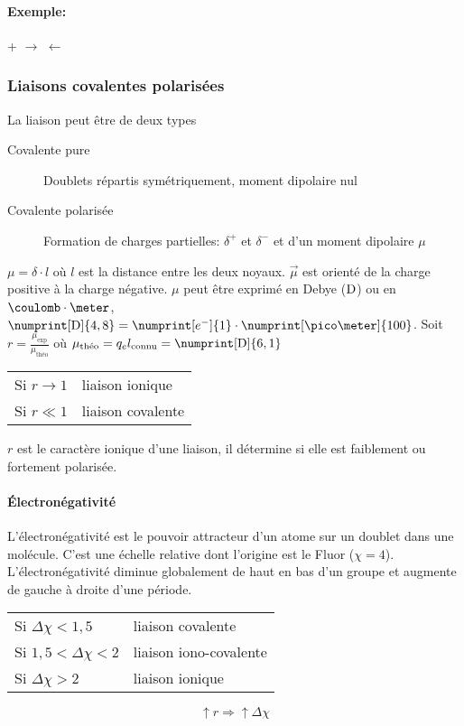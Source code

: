 \paragraph{Exemple:}
\begin{center}
  \hspace{0.3cm} + \hspace{0.3cm}$\longrightarrow$ $\leftarrow$
\end{center}
\subsubsection{Liaisons covalentes polarisées}
La liaison peut être de deux types
\begin{description}
  \item[Covalente pure] Doublets répartis symétriquement,
    moment dipolaire nul
  \item[Covalente polarisée] Formation de charges partielles:
    $\delta^+$ et $\delta^-$ et d'un moment dipolaire $\mu$
\end{description}
$\mu = \delta \cdot l$ où $l$ est la distance entre les deux noyaux.
$\vec{\mu}$ est orienté de la charge positive à la charge négative.
$\mu$ peut être exprimé en Debye ($\mathrm{D}$) ou en $\coulomb\cdot\meter$,
$\numprint[\debye]{4,8} = \numprint[e^-]{1} \cdot \numprint[\pico\meter]{100}$.
Soit $r = \frac{\mu_{\mathrm{exp}}}{\mu_{\textrm{théo}}}$
où $\mu_{\textrm{théo}} = q_e l_{\mathrm{connu}} = \numprint[\debye]{6,1}$
\begin{center}
  \begin{tabular}{ll}
    Si $r \to 1$ & liaison ionique\\
    Si $r \ll 1$ & liaison covalente
  \end{tabular}
\end{center}
$r$ est le caractère ionique d'une liaison,
il détermine si elle est faiblement ou fortement polarisée.

\paragraph{\'Electronégativité}
L'électronégativité est le pouvoir attracteur d'un atome sur un doublet dans une molécule.
C'est une échelle relative dont l'origine est le Fluor ($\chi = 4$). L'électronégativité
diminue globalement de haut en bas d'un groupe et augmente de gauche à droite d'une période.
\begin{center}
  \begin{tabular}{ll}
    Si $\Delta \chi < 1,5$ & liaison covalente\\
    Si $1,5 < \Delta \chi < 2$ & liaison iono-covalente\\
    Si $\Delta \chi > 2$ & liaison ionique
  \end{tabular}
\end{center}
$$\uparrow r \Rightarrow \uparrow \Delta \chi$$

